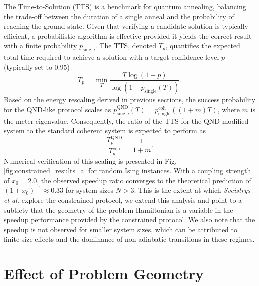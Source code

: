 \qquad The Time-to-Solution (TTS) is a benchmark for quantum annealing, balancing the trade-off between the duration of a single anneal and the probability of reaching the ground state. Given that verifying a candidate solution is typically efficient, a probabilistic algorithm is effective provided it yields the correct result with a finite probability $p_{\text{single}}$. The TTS, denoted $T_p$, quantifies the expected total time required to achieve a solution with a target confidence level $p$ (typically set to 0.95)
\begin{equation}
    T_p = \min_T \frac{T \log(1-p)}{\log(1-p_{\text{single}}(T))}.
\end{equation}
\qquad Based on the energy rescaling derived in previous sections, the success probability for the QND-like protocol scales as $p_{\text{single}}^{\text{QND}}(T) = p_{\text{single}}^{\text{coh}}((1+m)T)$, where $m$ is the meter eigenvalue. Consequently, the ratio of the TTS for the QND-modified system to the standard coherent system is expected to perform as
\begin{equation}
    \frac{T_p^{\text{QND}}}{T_p^{\text{coh}}} = \frac{1}{1+m}.
\end{equation}
\qquad Numerical verification of this scaling is presented in Fig. \ref{fig:constrained_results_a} for random Ising instances. With a coupling strength of $x_0 = 2.0$, the observed speedup ratio converges to the theoretical prediction of $(1+x_0)^{-1} \approx 0.33$ for system sizes $N > 3$. This is the extent at which \textit{Sveistrys et al.}\cite{DephasingPaper} explore the constrained protocol, we extend this analysis and point to a subtlety that the geometry of the problem Hamiltonian is a variable in the speedup performance provided by the constrained protocol. We also note that the speedup is not observed for smaller system sizes, which can be attributed to finite-size effects and the dominance of non-adiabatic transitions in these regimes.


\section{Effect of Problem Geometry}\label{sec:geometry}

